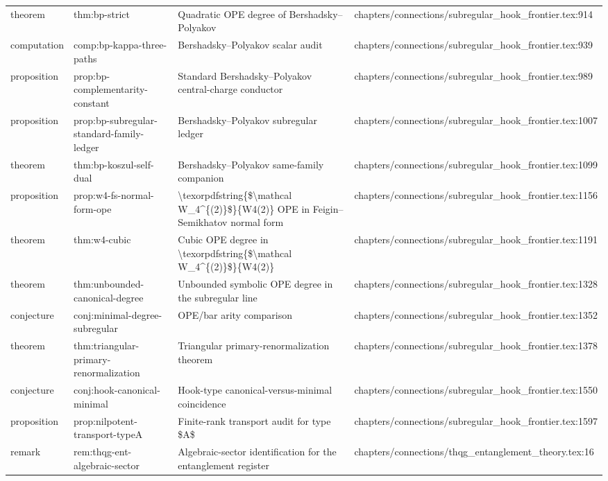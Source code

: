 \documentclass[11pt]{article}
\begin{document}
\begin{longtable}{L{0.10\textwidth}L{0.26\textwidth}L{0.42\textwidth}L{0.22\textwidth}}
theorem & thm:bp-strict & Quadratic OPE degree of Bershadsky--Polyakov & chapters/connections/subregular\_hook\_frontier.tex:914\\
computation & comp:bp-kappa-three-paths & Bershadsky--Polyakov scalar audit & chapters/connections/subregular\_hook\_frontier.tex:939\\
proposition & prop:bp-complementarity-constant & Standard Bershadsky--Polyakov central-charge conductor & chapters/connections/subregular\_hook\_frontier.tex:989\\
proposition & prop:bp-subregular-standard-family-led{}ger & Bershadsky--Polyakov subregular led{}ger & chapters/connections/subregular\_hook\_frontier.tex:1007\\
theorem & thm:bp-koszul-self-dual & Bershadsky--Polyakov same-family companion & chapters/connections/subregular\_hook\_frontier.tex:1099\\
proposition & prop:w4-fs-normal-form-ope & \textbackslash{}texorpdfstring\{\$\textbackslash{}mathcal W\_4\textasciicircum{}\{(2)\}\$\}\{W4(2)\} OPE in Feigin--Semikhatov normal form & chapters/connections/subregular\_hook\_frontier.tex:1156\\
theorem & thm:w4-cubic & Cubic OPE degree in \textbackslash{}texorpdfstring\{\$\textbackslash{}mathcal W\_4\textasciicircum{}\{(2)\}\$\}\{W4(2)\} & chapters/connections/subregular\_hook\_frontier.tex:1191\\
theorem & thm:unbounded-canonical-degree & Unbounded symbolic OPE degree in the subregular line & chapters/connections/subregular\_hook\_frontier.tex:1328\\
conjecture & conj:minimal-degree-subregular & OPE/bar arity comparison & chapters/connections/subregular\_hook\_frontier.tex:1352\\
theorem & thm:triangular-primary-renormalization & Triangular primary-renormalization theorem & chapters/connections/subregular\_hook\_frontier.tex:1378\\
conjecture & conj:hook-canonical-minimal & Hook-type canonical-versus-minimal coincidence & chapters/connections/subregular\_hook\_frontier.tex:1550\\
proposition & prop:nilpotent-transport-typeA & Finite-rank transport audit for type \$A\$ & chapters/connections/subregular\_hook\_frontier.tex:1597\\
remark & rem:thqg-ent-algebraic-sector & Algebraic-sector identification for the entanglement register & chapters/connections/thqg\_entanglement\_theory.tex:16\\

\end{longtable}
\end{document}
